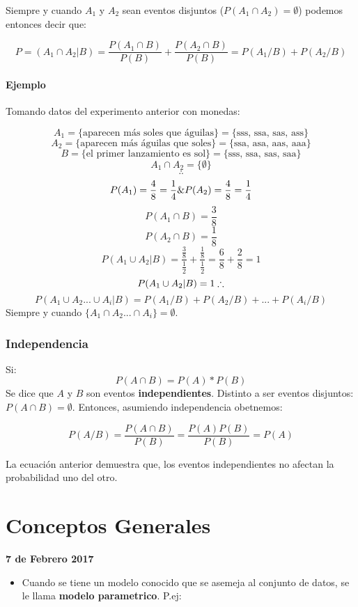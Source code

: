 \documentclass[]{book}
\providecommand{\tightlist}{%
  \setlength{\itemsep}{0pt}\setlength{\parskip}{0pt}}
\begin{document}
Siempre y cuando \(A_1\) y \(A_2\) sean eventos disjuntos
(\(P(A_1\cap A_2) = \emptyset\)) podemos entonces decir que:

\[P = (A_1 \cap A_2 \vert B) = \frac {P(A_1 \cap B)}{P(B)}+ \frac {P(A_2 \cap B)}{P(B)} = P(A_1/B) + P(A_2/B)\]

\subsubsection{Ejemplo}\label{ejemplo-1}

Tomando datos del experimento anterior con monedas:

\[A_1 = \{\text{aparecen más soles que águilas}\} = \{\text{sss, ssa, sas, ass}\}\]
\[A_2 = \{\text{aparecen más águilas que soles}\} = \{\text{ssa, asa, aas, aaa}\}\]
\[B = \{\text{el primer lanzamiento es sol}\} = \{\text{sss, ssa, sas, saa}\}\]
\[A_1 \cap A_2 = \{\emptyset\}\] \[\therefore\]
\[P(A_1) = \frac {4}{8} = \frac {1}{4}\space \& \space P(A_2) = \frac {4}{8} = \frac {1}{4}\]
\[P(A_1\cap B) = \frac{3}{8}\] \[P(A_2\cap B) = \frac{1}{8}\]
\[P(A_1\cup A_2\vert B) = \frac {\frac{3}{8}}{\frac{1}{2}} + \frac{\frac{1}{8}}{\frac{1}{2}} = \frac{6}{8} + \frac{2}{8} = 1\]
\[P(A_1\cup A_2\vert B) = 1 \space \therefore\]
\[P(A_1\cup A_2...\cup A_i \vert B) = P(A_1/B) + P(A_2/B)+...+ P(A_i/B)\]
Siempre y cuando \(\{A_1\cap A_2...\cap A_i\}= \emptyset\).

\subsection{Independencia}\label{independencia}

Si: \[P(A\cap B) = P(A)*P(B)\] Se dice que \(A\) y \(B\) son eventos
\textbf{independientes}. Distinto a ser eventos disjuntos:
\(P(A\cap B) = \emptyset\). Entonces, asumiendo independencia obetnemos:

\[P(A/B) = \frac {P(A\cap B)}{P(B)} = \frac{P(A)P(B)}{P(B)} = P(A)\]

La ecuación anterior demuestra que, los eventos independientes no
afectan la probabilidad uno del otro.

\chapter{Conceptos Generales}\label{conceptos-generales-1}

\textbf{7 de Febrero 2017}

\begin{itemize}
\tightlist
\item
  Cuando se tiene un modelo conocido que se asemeja al conjunto de
  datos, se le llama \textbf{modelo parametrico}. P.ej:
\end{itemize}
\end{document}
